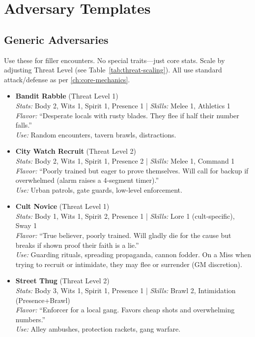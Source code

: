 \section{Adversary Templates}

\subsection{Generic Adversaries}
\label{subsec:generic-adversaries}
Use these for filler encounters. No special traits---just core stats. Scale by adjusting Threat Level (see Table~\ref{tab:threat-scaling}). All use standard attack/defense as per \autoref{ch:core-mechanics}.

\begin{itemize}
    \item \textbf{Bandit Rabble} (Threat Level 1) \\
    \textit{Stats:} Body 2, Wits 1, Spirit 1, Presence 1 \quad | \quad \textit{Skills:} Melee 1, Athletics 1 \\
    \textit{Flavor:} ``Desperate locals with rusty blades. They flee if half their number falls.'' \\
    \textit{Use:} Random encounters, tavern brawls, distractions.

    \item \textbf{City Watch Recruit} (Threat Level 2) \\
    \textit{Stats:} Body 2, Wits 1, Spirit 1, Presence 2 \quad | \quad \textit{Skills:} Melee 1, Command 1 \\
    \textit{Flavor:} ``Poorly trained but eager to prove themselves. Will call for backup if overwhelmed (alarm raises a 4‑segment timer).'' \\
    \textit{Use:} Urban patrols, gate guards, low-level enforcement.

    \item \textbf{Cult Novice} (Threat Level 1) \\
    \textit{Stats:} Body 1, Wits 1, Spirit 2, Presence 1 \quad | \quad \textit{Skills:} Lore 1 (cult-specific), Sway 1 \\
    \textit{Flavor:} ``True believer, poorly trained. Will gladly die for the cause but breaks if shown proof their faith is a lie.'' \\
    \textit{Use:} Guarding rituals, spreading propaganda, cannon fodder. On a Miss when trying to recruit or intimidate, they may flee or surrender (GM discretion).

    \item \textbf{Street Thug} (Threat Level 2) \\
    \textit{Stats:} Body 3, Wits 1, Spirit 1, Presence 1 \quad | \quad \textit{Skills:} Brawl 2, Intimidation (Presence+Brawl) \\
    \textit{Flavor:} ``Enforcer for a local gang. Favors cheap shots and overwhelming numbers.'' \\
    \textit{Use:} Alley ambushes, protection rackets, gang warfare.


\end{itemize}
